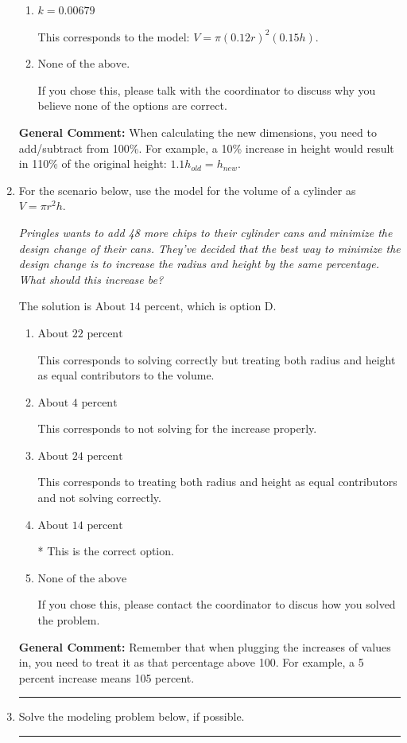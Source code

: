 \documentclass{extbook}[14pt]
\newcommand{\litem}[1]{\item #1

\rule{\textwidth}{0.4pt}}
\begin{document}
\begin{enumerate}
{\begin{enumerate}[label=\Alph*.]
This corresponds to the model: $V = (1.12 r)^2 (1.15 h)$.
\item \( k = 0.00679 \)

This corresponds to the model: $V = \pi (0.12 r)^2 (0.15 h)$.
\item \( \text{None of the above.} \)

If you chose this, please talk with the coordinator to discuss why you believe none of the options are correct.
\end{enumerate}

\textbf{General Comment:} When calculating the new dimensions, you need to add/subtract from 100\%. For example, a 10\% increase in height would result in 110\% of the original height: $1.1h_{old} = h_{new}$.
}
\litem{
For the scenario below, use the model for the volume of a cylinder as $V = \pi r^2 h$.

\begin{center}
    \textit{ Pringles wants to add 48 \text{percent} more chips to their cylinder cans and minimize the design change of their cans. They've decided that the best way to minimize the design change is to increase the radius and height by the same percentage. What should this increase be? }
\end{center}
The solution is \( \text{About } 14 \text{ percent} \), which is option D.\begin{enumerate}[label=\Alph*.]
\item \( \text{About } 22 \text{ percent} \)

This corresponds to solving correctly but treating both radius and height as equal contributors to the volume.
\item \( \text{About } 4 \text{ percent} \)

This corresponds to not solving for the increase properly.
\item \( \text{About } 24 \text{ percent} \)

This corresponds to treating both radius and height as equal contributors and not solving correctly.
\item \( \text{About } 14 \text{ percent} \)

* This is the correct option.
\item \( \text{None of the above} \)

If you chose this, please contact the coordinator to discus how you solved the problem.
\end{enumerate}

\textbf{General Comment:} Remember that when plugging the increases of values in, you need to treat it as that percentage above 100. For example, a 5 percent increase means 105 percent.
}
\litem{
Solve the modeling problem below, if possible.

}
\end{enumerate}
\end{document}
